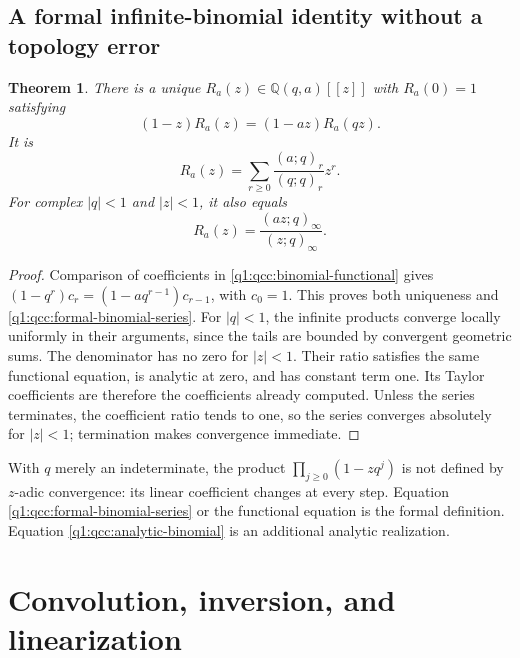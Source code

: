 \documentclass[11pt,a4paper,oneside,openany]{book}
\newtheorem{theorem}{Theorem}[chapter]
\theoremstyle{definition}
\theoremstyle{remark}
\newcommand{\Q}{\mathbb Q}
\begin{document}
\section{A formal infinite-binomial identity without a topology error}
\begin{theorem}\label{q1:qcc:infinite-binomial}
There is a unique \(R_a(z)\in\Q(q,a)[[z]]\) with \(R_a(0)=1\) satisfying
\begin{equation}\label{q1:qcc:binomial-functional}
 (1-z)R_a(z)=(1-az)R_a(qz).
\end{equation}
It is
\begin{equation}\label{q1:qcc:formal-binomial-series}
 R_a(z)=\sum_{r\ge0}\frac{(a;q)_r}{(q;q)_r}z^r.
\end{equation}
For complex \(|q|<1\) and \(|z|<1\), it also equals
\begin{equation}\label{q1:qcc:analytic-binomial}
 R_a(z)=\frac{(az;q)_\infty}{(z;q)_\infty}.
\end{equation}
\end{theorem}
\begin{proof}
Comparison of coefficients in \eqref{q1:qcc:binomial-functional} gives
\((1-q^r)c_r=(1-aq^{r-1})c_{r-1}\), with \(c_0=1\).
This proves both uniqueness and \eqref{q1:qcc:formal-binomial-series}.
For \(|q|<1\), the infinite products converge locally uniformly in their
arguments, since the tails are bounded by convergent geometric sums. The
denominator has no zero for \(|z|<1\). Their ratio satisfies the same functional
equation, is analytic at zero, and has constant term one. Its Taylor coefficients
are therefore the coefficients already computed. Unless the series terminates, the coefficient ratio tends
to one, so the series converges absolutely for \(|z|<1\); termination
makes convergence immediate.
\end{proof}
\begin{auditbox}
With \(q\) merely an indeterminate, the product
\(\prod_{j\ge0}(1-zq^j)\) is not defined by \(z\)-adic convergence: its linear
coefficient changes at every step. Equation \eqref{q1:qcc:formal-binomial-series}
or the functional equation is the formal definition. Equation
\eqref{q1:qcc:analytic-binomial} is an additional analytic realization.
\end{auditbox}
\chapter{Convolution, inversion, and linearization}
\label{q1:qcc:convolution}
\end{document}
